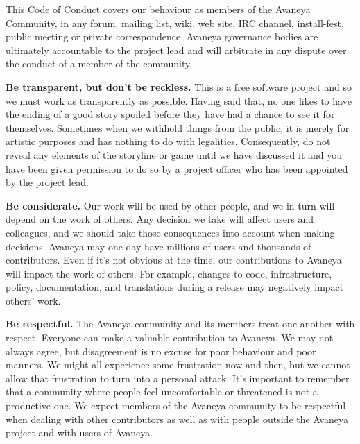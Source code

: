 
\blank
{}
\blank

This Code of Conduct covers our behaviour as members of the Avaneya Community, in any forum, mailing list, wiki, web site, IRC channel, install-fest, public meeting or private correspondence. Avaneya governance bodies are ultimately accountable to the project lead and will arbitrate in any dispute over the conduct of a member of the community.

\startitemize[R]
\setupwhitespace[big]
\item
{\bf Be transparent, but don't be reckless.} This is a free software project and so we must work as transparently as possible. Having said that, no one likes to have the ending of a good story spoiled before they have had a chance to see it for themselves. Sometimes when we withhold things from the public, it is merely for artistic purposes and has nothing to do with legalities. Consequently, do not reveal any elements of the storyline or game until we have discussed it and you have been given permission to do so by a project officer who has been appointed by the project lead.

\item
{\bf Be considerate.} Our work will be used by other people, and we in turn will depend on the work of others. Any decision we take will affect users and colleagues, and we should take those consequences into account when making decisions. Avaneya may one day have millions of users and thousands of contributors. Even if it's not obvious at the time, our contributions to Avaneya will impact the work of others. For example, changes to code, infrastructure, policy, documentation, and translations during a release may negatively impact others' work.

\item
{\bf Be respectful.} The Avaneya community and its members treat one another with respect. Everyone can make a valuable contribution to Avaneya. We may not always agree, but disagreement is no excuse for poor behaviour and poor manners. We might all experience some frustration now and then, but we cannot allow that frustration to turn into a personal attack. It's important to remember that a community where people feel uncomfortable or threatened is not a productive one. We expect members of the Avaneya community to be respectful when dealing with other contributors as well as with people outside the Avaneya project and with users of Avaneya.

